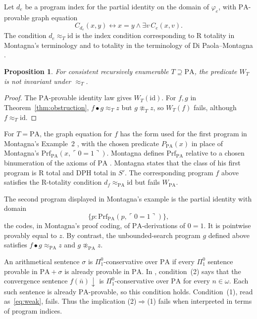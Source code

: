 \documentclass[11pt]{article}
\newtheorem{proposition}[theorem]{Proposition}
\newcommand{\PA}{\mathrm{PA}}
\begin{document}
Let $d_e$ be a program index for the partial identity on the domain of
$\varphi_e$, with $\PA$-provable graph equation
\[
 C_{d_e}(x,y)\longleftrightarrow x=y\land\exists v\,C_e(x,v).
\]
The condition $d_e\approx_T\mathrm{id}$ is the index condition
corresponding to R totality in Montagna's terminology
\cite[Definitions~1.6--1.7, p.~107]{Montagna} and to totality in the
terminology of Di Paola--Montagna
\cite[Definition~1.4, p.~645]{DiPaolaMontagna}.

\begin{proposition}\label{prop:weak}
For consistent recursively enumerable $T\supseteq\PA$, the predicate
$W_T$ is not invariant under $\approx_T$.
\end{proposition}

\begin{proof}
The $\PA$-provable identity law gives $W_T(\mathrm{id})$.
For $f,g$ in Theorem~\ref{thm:obstruction},
$f\bullet g\approx_Tz$ but $g\not\approx_Tz$, so $W_T(f)$ fails,
although $f\approx_T\mathrm{id}$.
\end{proof}

For $T=\PA$, the graph equation for $f$ has the form used for the first
program in Montagna's Example~2 \cite[p.~112]{Montagna}, with the chosen
predicate $P_{\PA}(x)$ in place of Montagna's
$\mathrm{Prf}_{\PA}(x,\ulcorner0=1\urcorner)$. Montagna defines
$\mathrm{Prf}_{\PA}$ relative to a chosen binumeration of the axioms of
$\PA$ \cite[note~2, p.~115]{Montagna}. Montagna states that the class of
his first program is R total and DPH total in $S'$. The corresponding
program $f$ above satisfies the R-totality condition
$d_f\approx_{\PA}\mathrm{id}$ but fails $W_{\PA}$.

The second program displayed in Montagna's example is the partial identity
with domain
\[
 \{p:\mathrm{Prf}_{\PA}(p,\ulcorner0=1\urcorner)\},
\]
the codes, in Montagna's proof coding, of $\PA$-derivations of $0=1$. It is
pointwise provably equal to $z$. By contrast, the unbounded-search program
$g$ defined above satisfies $f\bullet g\approx_{\PA}z$ and
$g\not\approx_{\PA}z$.

An arithmetical sentence $\sigma$ is $\Pi^0_1$-conservative over
$\PA$ if every $\Pi^0_1$ sentence provable in $\PA+\sigma$ is
already provable in $\PA$.
In \cite[Theorem~2.3, p.~111]{Montagna}, condition~(2) says that
the convergence sentence $f(\bar n)\downarrow$ is
$\Pi^0_1$-conservative over $\PA$ for every $n\in\omega$.
Each such sentence is already $\PA$-provable, so this condition holds.
Condition~(1), read as~\eqref{eq:weak}, fails.
Thus the implication (2)$\Rightarrow$(1) fails when interpreted in
terms of program indices.
\end{document}
